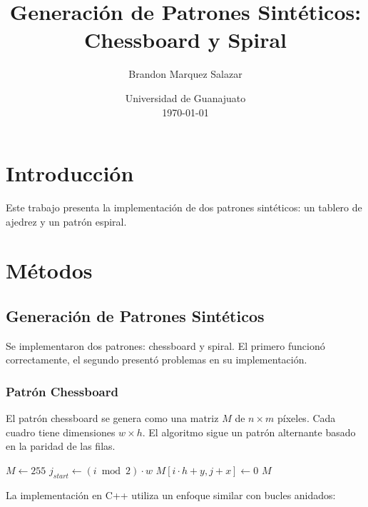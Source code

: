 \documentclass[10pt]{article}
\title{Generación de Patrones Sintéticos: Chessboard y Spiral}
\author{Brandon Marquez Salazar}
\date{Universidad de Guanajuato \\ \today}
\begin{document}
\maketitle

\section{Introducción}

Este trabajo presenta la implementación de dos patrones sintéticos: un tablero de ajedrez y un patrón espiral.

\section{Métodos}

\subsection{Generación de Patrones Sintéticos}

Se implementaron dos patrones: chessboard y spiral. El primero funcionó correctamente, el segundo presentó problemas en su implementación.

\subsubsection{Patrón Chessboard}

El patrón chessboard se genera como una matriz $M$ de $n \times m$ píxeles. Cada cuadro tiene dimensiones $w \times h$. El algoritmo sigue un patrón alternante basado en la paridad de las filas.

\begin{algorithm}
\caption{Generación de Chessboard}
\begin{algorithmic}[1]
\State $M \gets 255$ 
    \State $j_{start} \gets (i \bmod 2) \cdot w$
                \State $M[i \cdot h + y, j + x] \gets 0$
            \EndFor
        \EndFor
    \EndFor
\EndFor
\State \Return $M$
\EndProcedure
\end{algorithmic}
\end{algorithm}

La implementación en C++ utiliza un enfoque similar con bucles anidados:
\end{document}

